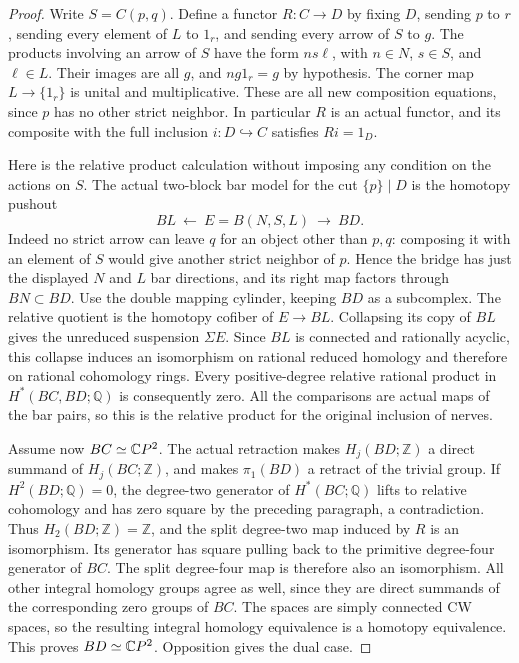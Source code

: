 \begin{proof}
Write $S=C(p,q)$. Define a functor $R:C\to D$ by fixing $D$,
sending $p$ to $r$, sending every element of $L$ to $1_r$,
and sending every arrow of $S$ to $g$.
The products involving an arrow of $S$ have the form $ns\ell$,
with $n\in N$, $s\in S$, and $\ell\in L$.
Their images are all $g$, and $ng1_r=g$ by hypothesis.
The corner map $L\to\{1_r\}$ is unital and multiplicative.
These are all new composition equations, since $p$ has no other
strict neighbor. In particular $R$ is an actual functor, and
its composite with the full inclusion $i:D\hookrightarrow C$
satisfies $Ri=1_D$.

Here is the relative product calculation without imposing any
condition on the actions on $S$. The actual two-block bar model
for the cut $\{p\}\mid D$ is the homotopy pushout
\[
 BL\ \longleftarrow\ E=B(N,S,L)\ \longrightarrow\ BD.
\]
Indeed no strict arrow can leave $q$ for an object other than $p,q$:
composing it with an element of $S$ would give another strict
neighbor of $p$. Hence the bridge has just the displayed $N$ and
$L$ bar directions, and its right map factors through $BN\subset BD$.
Use the double mapping cylinder, keeping $BD$ as a subcomplex.
The relative quotient is the homotopy cofiber of $E\to BL$.
Collapsing its copy of $BL$ gives the unreduced suspension
$\Sigma E$. Since $BL$ is connected and rationally acyclic,
this collapse induces an isomorphism on rational reduced
homology and therefore on rational cohomology rings.
Every positive-degree relative rational product in
$H^*(BC,BD;\mathbb Q)$ is consequently zero.
All the comparisons are actual maps of the bar pairs, so this
is the relative product for the original inclusion of nerves.

Assume now $BC\simeq\mathbb{C}P^2$. The actual retraction makes
$H_j(BD;\mathbb Z)$ a direct summand of $H_j(BC;\mathbb Z)$,
and makes $\pi_1(BD)$ a retract of the trivial group.
If $H^2(BD;\mathbb Q)=0$, the degree-two generator of
$H^*(BC;\mathbb Q)$ lifts to relative cohomology and has zero
square by the preceding paragraph, a contradiction.
Thus $H_2(BD;\mathbb Z)=\mathbb Z$, and the split degree-two
map induced by $R$ is an isomorphism. Its generator has square
pulling back to the primitive degree-four generator of $BC$.
The split degree-four map is therefore also an isomorphism.
All other integral homology groups agree as well, since they
are direct summands of the corresponding zero groups of $BC$.
The spaces are simply connected CW spaces, so the resulting
integral homology equivalence is a homotopy equivalence.
This proves $BD\simeq\mathbb{C}P^2$. Opposition gives the dual case.
\end{proof}

